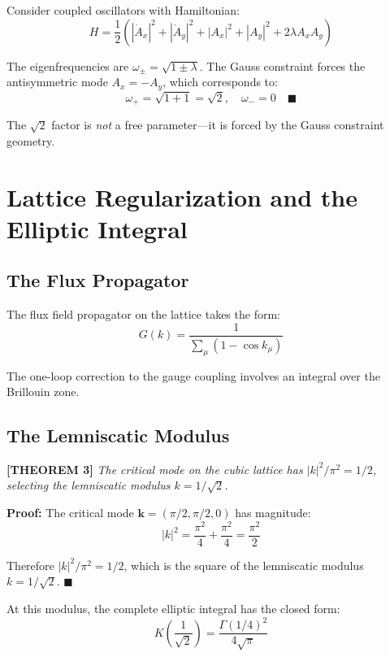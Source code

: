 \documentclass[aps,prd,twocolumn,10pt,groupedaddress,superscriptaddress]{revtex4-2}
\begin{document}
Consider coupled oscillators with Hamiltonian:
\begin{equation}
H = \frac{1}{2}(|\dot{A}_x|^2 + |\dot{A}_y|^2 + |A_x|^2 + |A_y|^2 + 2\lambda A_x A_y)
\end{equation}

The eigenfrequencies are $\omega_\pm = \sqrt{1 \pm \lambda}$. The Gauss constraint forces the antisymmetric mode $A_x = -A_y$, which corresponds to:
\begin{equation}
\omega_+ = \sqrt{1 + 1} = \sqrt{2}, \quad \omega_- = 0 \quad \blacksquare
\end{equation}

The $\sqrt{2}$ factor is \textit{not} a free parameter---it is forced by the Gauss constraint geometry.

\section{Lattice Regularization and the Elliptic Integral}

\subsection{The Flux Propagator}

The flux field propagator on the lattice takes the form:
\begin{equation}
G(k) = \frac{1}{\sum_\mu (1 - \cos k_\mu)}
\end{equation}

The one-loop correction to the gauge coupling involves an integral over the Brillouin zone.

\subsection{The Lemniscatic Modulus}

\textbf{[THEOREM 3]} \textit{The critical mode on the cubic lattice has $|k|^2/\pi^2 = 1/2$, selecting the lemniscatic modulus $k = 1/\sqrt{2}$.}

\textbf{Proof:} The critical mode $\mathbf{k} = (\pi/2, \pi/2, 0)$ has magnitude:
\begin{equation}
|k|^2 = \frac{\pi^2}{4} + \frac{\pi^2}{4} = \frac{\pi^2}{2}
\end{equation}

Therefore $|k|^2/\pi^2 = 1/2$, which is the square of the lemniscatic modulus $k = 1/\sqrt{2}$. $\blacksquare$

At this modulus, the complete elliptic integral has the closed form:
\begin{equation}
K\left(\frac{1}{\sqrt{2}}\right) = \frac{\Gamma(1/4)^2}{4\sqrt{\pi}}
\end{equation}
\end{document}
